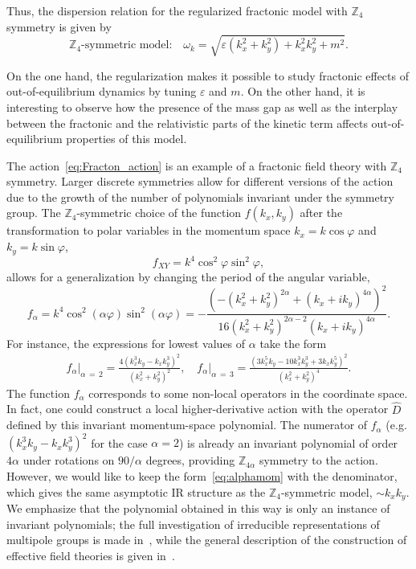 \documentclass[a4paper,12pt]{article}
\newcommand{\be}{\begin{equation}}
\newcommand{\ee}{\end{equation}}
\newcommand{\skipline}{\vspace{\baselineskip}}
\newcommand{\eps}{\varepsilon}
\newcommand{\om}{\omega}
\newcommand{\Z}[1]{\mathbb{Z}_{#1}}
\begin{document}
Thus, the dispersion relation for the regularized fractonic model with $\Z4$ symmetry is given by
\be 
    \Z4\text{-symmetric model:} \quad \om_k = \sqrt{\eps\left(k_x^2 + k_y^2\right) + k_x^2 k_y^2 + m^2}.
    \label{eq:Z4disprel}
\ee

On the one hand, the regularization makes it possible to study fractonic effects of out-of-equilibrium dynamics by tuning $\eps$ and $m$. On the other hand, it is interesting to observe how the presence of the mass gap as well as the interplay between the fractonic and the relativistic parts of the kinetic term affects out-of-equilibrium properties of this model.

\skipline

The action~\eqref{eq:Fracton_action} is an example of a fractonic field theory with $\Z4$ symmetry. Larger discrete symmetries allow for different versions of the action due to the growth of the number of polynomials invariant under the symmetry group. The $\Z4$-symmetric choice of the function $f(k_x, k_y)$ after the transformation to polar variables in the momentum space $k_x = k\cos\varphi$ and $k_y = k\sin\varphi$,
\be 
    f_{XY} = k^4 \cos^2\varphi \sin^2\varphi,
\ee 
allows for a generalization by changing the period of the angular variable,
\be
    f_\alpha = k^4 \cos^2(\alpha\varphi) \sin^2(\alpha\varphi) = -\frac{\left(-\left(k_x^2 + k_y^2\right)^{2\alpha} + \left(k_x + i k_y\right)^{4\alpha}\right)^2}{16\left(k_x^2 + k_y^2\right)^{2\alpha - 2}\left(k_x + i k_y\right)^{4\alpha}}.
    \label{eq:alphamom}
\ee
For instance, the expressions for lowest values of $\alpha$ take the form
\begin{gather} 
    f_\alpha\Big\rvert_{\alpha\,=\,2} = \frac{4\left(k_x^3 k_y - k_x k_y^3\right)^2}{\left(k_x^2 + k_y^2\right)^2}, \quad f_\alpha\Big\rvert_{\alpha\,=\,3} = \frac{\left(3 k_x^5 k_y - 10 k_x^3 k_y^3 + 3 k_x k_y^5\right)^2}{\left(k_x^2 + k_y^2\right)^4}.
\end{gather}
The function $f_\alpha$ corresponds to some non-local operators in the coordinate space. In fact, one could construct a local higher-derivative action with the operator $\hat{D}$ defined by this invariant momentum-space polynomial. The numerator of $f_\alpha$ (e.g. $(k_x^3 k_y - k_x k_y^3)^2$ for the case $\alpha = 2$) is already an invariant polynomial of order $4\alpha$ under rotations on $90/\alpha$ degrees, providing $\Z{4\alpha}$ symmetry to the action. However, we would like to keep the form~\eqref{eq:alphamom} with the denominator, which gives the same asymptotic IR structure as the $\Z4$-symmetric model, $\sim k_xk_y$. We emphasize that the polynomial obtained in this way is only an instance of invariant polynomials; the full investigation of irreducible representations of multipole groups is made in~\cite{Bulmash:2023msp}, while the general description of the construction of effective field theories is given in~\cite{Gromov2019towards}.
\end{document}
